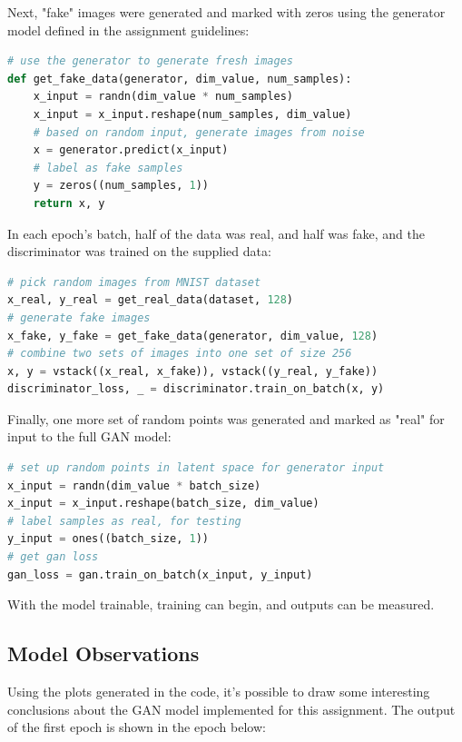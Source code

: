 \documentclass{article}
\begin{document}
\par Next, "fake" images were generated and marked with zeros using the generator model defined in the assignment guidelines:

\begin{lstlisting}[language=Python]
# use the generator to generate fresh images
def get_fake_data(generator, dim_value, num_samples):
	x_input = randn(dim_value * num_samples)
	x_input = x_input.reshape(num_samples, dim_value)
	# based on random input, generate images from noise
	x = generator.predict(x_input)
	# label as fake samples
	y = zeros((num_samples, 1))
	return x, y
\end{lstlisting}

\par In each epoch's batch, half of the data was real, and half was fake, and the discriminator was trained on the supplied data:

\begin{lstlisting}[language=Python]
# pick random images from MNIST dataset
x_real, y_real = get_real_data(dataset, 128)
# generate fake images
x_fake, y_fake = get_fake_data(generator, dim_value, 128)
# combine two sets of images into one set of size 256
x, y = vstack((x_real, x_fake)), vstack((y_real, y_fake))
discriminator_loss, _ = discriminator.train_on_batch(x, y)
\end{lstlisting}

\par Finally, one more set of random points was generated and marked as "real" for input to the full GAN model:

\begin{lstlisting}[language=Python]
# set up random points in latent space for generator input
x_input = randn(dim_value * batch_size)
x_input = x_input.reshape(batch_size, dim_value)
# label samples as real, for testing
y_input = ones((batch_size, 1))
# get gan loss
gan_loss = gan.train_on_batch(x_input, y_input)
\end{lstlisting}

\par With the model trainable, training can begin, and outputs can be measured.

\subsection{Model Observations} \label{model_obvs}
\par Using the plots generated in the code, it's possible to draw some interesting conclusions about the GAN model implemented for this assignment.
The output of the first epoch is shown in the epoch below:
\end{document}
